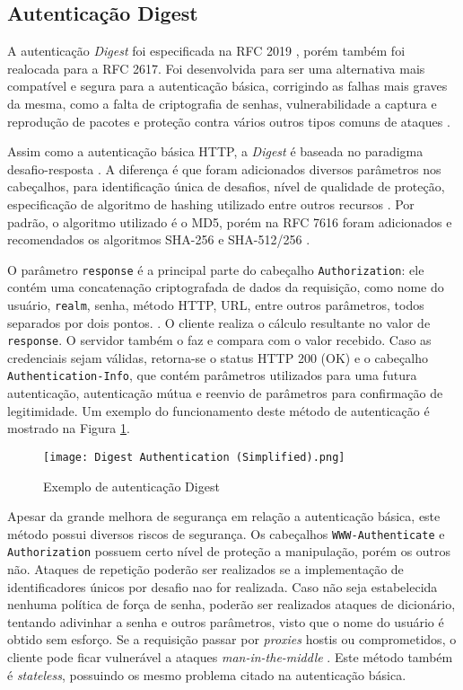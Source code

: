 \subsection{Autenticação Digest}

A autenticação \emph{Digest} foi especificada na RFC 2019 \cite{RFC2019}, porém também foi 
realocada para a RFC 2617. Foi desenvolvida para ser uma alternativa mais compatível e segura  para 
a autenticação básica, corrigindo as falhas mais graves da mesma, como a falta de criptografia de 
senhas, vulnerabilidade a captura e reprodução de pacotes e proteção contra vários outros tipos comuns de ataques \cite{GOURLEY2002}.

Assim como a autenticação básica HTTP, a \emph{Digest} é baseada no paradigma 
desafio-resposta \cite{RFC7616}. A diferença é que foram adicionados diversos parâmetros nos cabeçalhos, para identificação única de desafios, nível de qualidade de proteção, especificação de algoritmo de hashing utilizado entre outros recursos \cite{CHAPMAN2012}. Por padrão, o algoritmo utilizado é o MD5, porém na RFC 7616 foram adicionados e recomendados os algoritmos SHA-256 e SHA-512/256 \cite{RFC7616}.

O parâmetro \texttt{response} é a principal parte do cabeçalho \texttt{Authorization}: ele contém 
uma concatenação criptografada de dados da requisição, como nome do usuário, \texttt{realm}, senha, 
método HTTP, URL, entre outros parâmetros, todos separados por dois pontos. \cite{CHAPMAN2012}. O cliente realiza o cálculo resultante no valor de \texttt{response}. O servidor também o faz e 
compara com o valor recebido. Caso as credenciais sejam válidas, retorna-se o status HTTP 200 (OK)
e o cabeçalho \texttt{Authentication-Info}, que contém parâmetros utilizados para uma futura 
autenticação, autenticação mútua e reenvio de parâmetros para confirmação de legitimidade. Um 
exemplo do funcionamento deste método de autenticação é mostrado na Figura \ref{fig:digestAuth}.

\begin{figure}[ht]
  \centering
  \texttt{[image: Digest Authentication (Simplified).png]}
  \caption{Exemplo de autenticação Digest}
  \label{fig:digestAuth}
\end{figure}

Apesar da grande melhora de segurança em relação a autenticação básica, este método possui 
diversos riscos de segurança. Os cabeçalhos \texttt{WWW-Authenticate} e \texttt{Authorization} 
possuem certo nível de proteção a manipulação, porém os outros não. Ataques de repetição poderão 
ser realizados se a implementação de identificadores únicos por desafio nao for realizada. Caso não
seja estabelecida nenhuma política de força de senha, poderão ser realizados ataques de dicionário, 
tentando adivinhar a senha e outros parâmetros, visto que o nome do usuário é obtido sem esforço.
Se a requisição passar por \emph{proxies} hostis ou comprometidos, o cliente pode ficar vulnerável 
a ataques \emph{man-in-the-middle} \cite{GOURLEY2002}. Este método também é \emph{stateless}, possuindo os mesmo problema citado na autenticação básica.